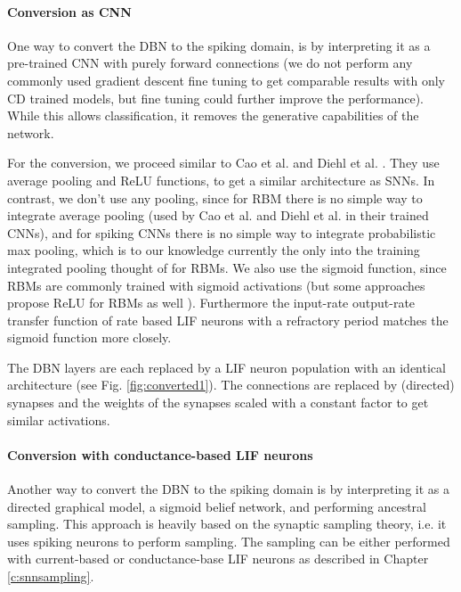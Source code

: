 \paragraph{Conversion as CNN}  \label{c:convascnn}

One way to convert the DBN to the spiking domain, is by interpreting it as a pre-trained CNN with purely forward connections (we do not perform any commonly used gradient descent fine tuning to get comparable results with only CD trained models, but fine tuning could further improve the performance).
While this allows classification, it removes the generative capabilities of the network.

For the conversion, we proceed similar to Cao et al. and Diehl et al. \cite{Cao2014}\cite{Diehl2015} .
They use average pooling and ReLU functions, to get a similar architecture as SNNs.
In contrast, we don't use any pooling, since for RBM there is no simple way to integrate average pooling (used by Cao et al. and Diehl et al. in their trained CNNs), and for spiking CNNs there is no simple way to integrate probabilistic max pooling, which is to our knowledge currently the only into the training integrated pooling thought of for RBMs.
We also use the sigmoid function, since RBMs are commonly trained with sigmoid activations (but some approaches propose ReLU for RBMs as well \cite{Nair2010}).
Furthermore the input-rate output-rate transfer function of rate based LIF neurons with a refractory period matches the sigmoid function more closely.

The DBN layers are each replaced by a LIF neuron population with an identical architecture (see Fig. \ref{fig:converted1}). 
The connections are replaced by (directed) synapses and the weights of the synapses scaled with a constant factor to get similar activations.
 

\paragraph{Conversion with conductance-based LIF neurons} \label{c:convascoba}

Another way to convert the DBN to the spiking domain is by interpreting it as a directed graphical model, a sigmoid belief network, and performing ancestral sampling.
This approach is heavily based on the synaptic sampling theory, i.e. it uses spiking neurons to perform sampling.
The sampling can be either performed with current-based or conductance-base LIF neurons as described in Chapter \ref{c:snnsampling}.

